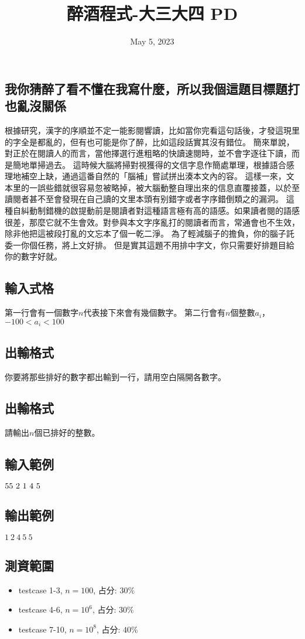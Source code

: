 \documentclass{article}
\title{醉酒程式-大三大四 PD}
\date{May 5, 2023}
\begin{document}
\begin{CJK*}{UTF8}{bsmi}

\maketitle

\section*{我你猜醉了看不懂在我寫什麼，所以我個這題目標題打也亂沒關係}

根據研究，漢字的序順並不定一能影閱響讀，比如當你完看這句話後，才發這現里的字全是都亂的，但有也可能是你了醉，比如這段話實其沒有錯位。
簡來單說，對正於在閱讀人的而言，當他擇選行進粗略的快讀速閱時，並不會字逐往下讀，而是簡地單掃過去。
這時候大腦將掃對視獲得的文信字息作簡處單理，根據語合感理地補空上缺，通過這番自然的「腦補」嘗試拼出湊本文內的容。
這樣一來，文本里的一誤些錯就很容易忽被略掉，被大腦動整自理出來的信息直覆接蓋，以於至讀閱者甚不至會發現在自己讀的文里本頭有别錯字或者字序錯倒類之的漏洞。
這種自糾動制錯機的啟提動前是閱讀者對這種語言極有高的語感。如果讀者閱的語感很差，那麼它就不生會效。對參與本文字序亂打的閱讀者而言，常通會也不生效，除非他把這被段打亂的文忘本了個一乾二淨。
為了輕減腦子的擔負，你的腦子託委一你個任務，將上文好排。
但是實其這題不用排中字文，你只需要好排題目給你的數字好就。

\subsection*{輸入式格}
第一行會有一個數字$n$代表接下來會有幾個數字。
第二行會有$n$個整數$a_i$，$-100<a_i<100$
\subsection*{出輸格式}
你要將那些排好的數字都出輸到一行，請用空白隔開各數字。

\subsection*{出輸格式}
請輸出$n$個已排好的整數。

\subsection*{輸入範例}
$5\\5\ 2\ 1\ 4\ 5$
\subsection*{輸出範例}
$1\ 2\ 4\ 5\ 5$

\subsection*{測資範圍}
\begin{itemize}
    \item testcase 1-3, $n=100$, 占分: $30\%$
    \item testcase 4-6, $n=10^6$, 占分: $30\%$
    \item testcase 7-10, $n=10^8$, 占分: $40\%$
\end{itemize}

\end{CJK*}
\end{document}
